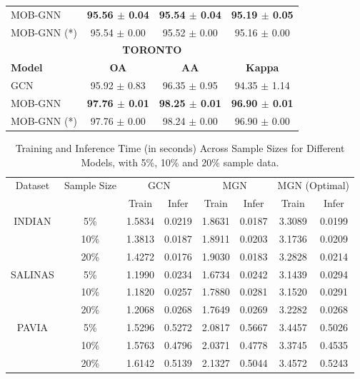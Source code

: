 \begin{table}[h]
\begin{minipage}{0.49\textwidth}
\begin{tabular}{|lccc|}
MOB-GNN & \textbf{95.56 $\pm$ 0.04} & \textbf{95.54 $\pm$ 0.04} & \textbf{95.19 $\pm$ 0.05} \\
MOB-GNN (*) & 95.54 $\pm$ 0.00 & 95.52 $\pm$ 0.00 & 95.16 $\pm$ 0.00 \\
\hline
\multicolumn{4}{|c|}{\textbf{TORONTO}} \\
\hline
\textbf{Model} & \textbf{OA} & \textbf{AA} & \textbf{Kappa} \\
\hline
GCN & 95.92 $\pm$ 0.83 & 96.35 $\pm$ 0.95 & 94.35 $\pm$ 1.14 \\
MOB-GNN & \textbf{97.76 $\pm$ 0.01} & \textbf{98.25 $\pm$ 0.01} & \textbf{96.90 $\pm$ 0.01} \\
MOB-GNN (*) & 97.76 $\pm$ 0.00 & 98.24 $\pm$ 0.00 & 96.90 $\pm$ 0.00 \\
\hline
\end{tabular}
    \end{minipage}
\end{table}


\begin{table}[h]
\centering
\caption{Training and Inference Time (in seconds) Across Sample Sizes for Different Models, with 5\%, 10\% and 20\% sample data.}
\begin{tabular}{cccccccc}
\toprule
\multirow{2}{*}{Dataset} & \multirow{2}{*}{Sample Size} & \multicolumn{2}{c}{GCN} & \multicolumn{2}{c}{MGN} & \multicolumn{2}{c}{MGN (Optimal)} \\
\cmidrule(lr){3-4} \cmidrule(lr){5-6} \cmidrule(lr){7-8}
 & & Train & Infer & Train & Infer & Train & Infer \\
\midrule
\multirow{3}{*}{INDIAN} & 5\% & 1.5834 & 0.0219 & 1.8631 & 0.0187 & 3.3089 & 0.0199 \\
                        & 10\% & 1.3813 & 0.0187 & 1.8911 & 0.0203 & 3.1736 & 0.0209 \\
                        & 20\% & 1.4272 & 0.0176 & 1.9030 & 0.0183 & 3.2828 & 0.0214 \\
\midrule
\multirow{3}{*}{SALINAS} & 5\% & 1.1990 & 0.0234 & 1.6734 & 0.0242 & 3.1439 & 0.0294 \\
                         & 10\% & 1.1820 & 0.0257 & 1.7880 & 0.0281 & 3.1520 & 0.0291 \\
                         & 20\% & 1.2068 & 0.0268 & 1.7649 & 0.0269 & 3.2282 & 0.0268 \\
\midrule
\multirow{3}{*}{PAVIA} & 5\% & 1.5296 & 0.5272 & 2.0817 & 0.5667 & 3.4457 & 0.5026 \\
                       & 10\% & 1.5763 & 0.4796 & 2.0371 & 0.4778 & 3.3745 & 0.4535 \\
                       & 20\% & 1.6142 & 0.5139 & 2.1327 & 0.5044 & 3.4572 & 0.5243 \\
\bottomrule
\end{tabular}
\label{tab:training_inference_times}
\end{table}